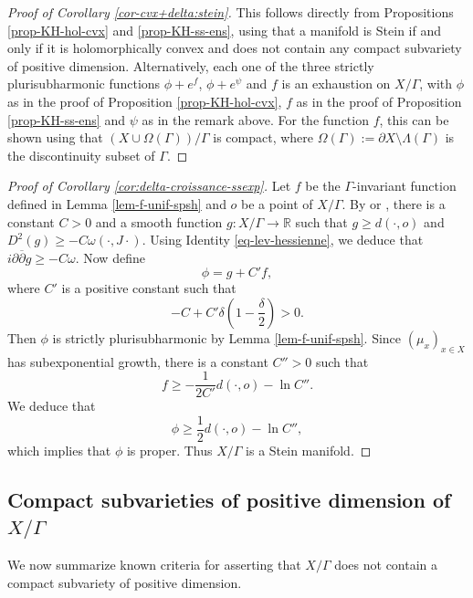 \documentclass{article}
\theoremstyle{definition}
\theoremstyle{remark}
\newcommand{\R}{\mathbb{R}}
\begin{document}
\begin{proof}[Proof of Corollary \ref{cor-cvx+delta:stein}]
	This follows directly from Propositions \ref{prop-KH-hol-cvx} and \ref{prop-KH-ss-ens}, using that a manifold is Stein if and only if it is holomorphically convex and does not contain any compact subvariety of positive dimension. Alternatively, each one of the three strictly plurisubharmonic functions $\phi+e^{f}$, $\phi+e^{\psi}$ and $f$ is an exhaustion on $X/\Gamma$, with $\phi$ as in the proof of Proposition \ref{prop-KH-hol-cvx}, $f$ as in the proof of Proposition \ref{prop-KH-ss-ens} and $\psi$ as in the remark above. For the function $f$, this can be shown using that $(X\cup\Omega(\Gamma))/\Gamma$ is compact, where $\Omega(\Gamma):= \partial X\setminus \Lambda(\Gamma)$ is the discontinuity subset of $\Gamma$.
\end{proof}



\begin{proof}[Proof of Corollary \ref{cor:delta-croissance-ssexp}]
	Let $f$ be the $\Gamma$-invariant function defined in Lemma \ref{lem-f-unif-spsh} and $o$ be a point of $X/\Gamma$. By \cite{tamExhaustionFunctionsComplete2010} or \cite[§4 of Ch. 26]{chowRicciFlowTechniques2010}, there is a constant $C>0$ and a smooth function $g:X/\Gamma \to \R$ such that $g\ge d(\cdot,o)$ and $D^{2}(g)\ge -C\omega(\cdot,J\cdot)$. Using Identity \eqref{eq-lev-hessienne}, we deduce that $i\partial\overline{\partial}g\ge -C\omega$. Now define\begin{equation*}
		\phi = g + C'f,
	\end{equation*}
	where $C'$ is a positive constant such that\begin{equation*}
		-C+C'\delta(1-\frac{\delta}{2})>0.
	\end{equation*}
	Then $\phi$ is strictly plurisubharmonic by Lemma \ref{lem-f-unif-spsh}. Since $(\mu_x)_{x\in X}$ has subexponential growth, there is a constant $C''>0$ such that\begin{equation*}
		f\ge -\frac{1}{2C'}d(\cdot,o) -\ln C''.
	\end{equation*}
	We deduce that \begin{equation*}
		\phi \ge \frac{1}{2}d(\cdot,o) -\ln C'',
	\end{equation*}
	which implies that $\phi$ is proper. Thus $X/\Gamma$ is a Stein manifold.
\end{proof}
	
	\subsection{Compact subvarieties of positive dimension of $X/\Gamma$}\label{ss-section-criteres}
	We now summarize known criteria for asserting that $X/\Gamma$ does not contain a compact subvariety of positive dimension. 
	
\end{document}
